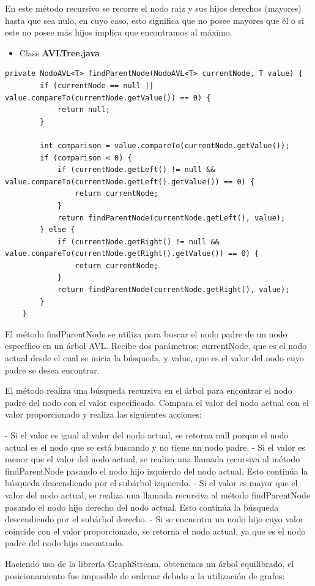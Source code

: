 \documentclass{article}
\begin{document}
En este método recursivo se recorre el nodo raiz y sus hijos derechos (mayores) hasta que sea nulo, en cuyo caso, esto significa que no posee mayores que él o si este no posee más hijos implica que encontramos al máximo.
\begin{itemize}
        \item Class \textbf{AVLTree.java}
    \end{itemize}
    \begin{lstlisting}[caption={\textbf{Parte 2:}}]
	private NodoAVL<T> findParentNode(NodoAVL<T> currentNode, T value) {
		if (currentNode == null || value.compareTo(currentNode.getValue()) == 0) {
			return null;
		}

		int comparison = value.compareTo(currentNode.getValue());
		if (comparison < 0) {
			if (currentNode.getLeft() != null && value.compareTo(currentNode.getLeft().getValue()) == 0) {
				return currentNode;
			}
			return findParentNode(currentNode.getLeft(), value);
		} else {
			if (currentNode.getRight() != null && value.compareTo(currentNode.getRight().getValue()) == 0) {
				return currentNode;
			}
			return findParentNode(currentNode.getRight(), value);
		}
	}
         \end{lstlisting}
El método findParentNode se utiliza para buscar el nodo padre de un nodo específico en un árbol AVL. Recibe dos parámetros: currentNode, que es el nodo actual desde el cual se inicia la búsqueda, y value, que es el valor del nodo cuyo padre se desea encontrar.

El método realiza una búsqueda recursiva en el árbol para encontrar el nodo padre del nodo con el valor especificado. Compara el valor del nodo actual con el valor proporcionado y realiza las siguientes acciones:

- Si el valor es igual al valor del nodo actual, se retorna null porque el nodo actual es el nodo que se está buscando y no tiene un nodo padre.
- Si el valor es menor que el valor del nodo actual, se realiza una llamada recursiva al método findParentNode pasando el nodo hijo izquierdo del nodo actual. Esto continúa la búsqueda descendiendo por el subárbol izquierdo.
- Si el valor es mayor que el valor del nodo actual, se realiza una llamada recursiva al método findParentNode pasando el nodo hijo derecho del nodo actual. Esto continúa la búsqueda descendiendo por el subárbol derecho.
- Si se encuentra un nodo hijo cuyo valor coincide con el valor proporcionado, se retorna el nodo actual, ya que es el nodo padre del nodo hijo encontrado.


Haciendo uso de la librería GraphStream, obtenemos un árbol equilibrado, el posicionamiento fue imposible de ordenar debido a la utilización de grafos:
\end{document}
